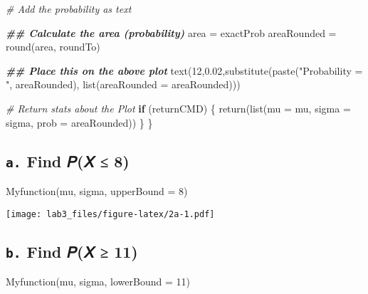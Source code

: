 \documentclass[
  12pt,
]{article}
\newenvironment{Shaded}{\begin{snugshade}}{\end{snugshade}}
\newcommand{\AttributeTok}[1]{\textcolor[rgb]{0.77,0.63,0.00}{#1}}
\newcommand{\CommentTok}[1]{\textcolor[rgb]{0.56,0.35,0.01}{\textit{#1}}}
\newcommand{\ControlFlowTok}[1]{\textcolor[rgb]{0.13,0.29,0.53}{\textbf{#1}}}
\newcommand{\DecValTok}[1]{\textcolor[rgb]{0.00,0.00,0.81}{#1}}
\newcommand{\DocumentationTok}[1]{\textcolor[rgb]{0.56,0.35,0.01}{\textbf{\textit{#1}}}}
\newcommand{\FloatTok}[1]{\textcolor[rgb]{0.00,0.00,0.81}{#1}}
\newcommand{\FunctionTok}[1]{\textcolor[rgb]{0.00,0.00,0.00}{#1}}
\newcommand{\NormalTok}[1]{#1}
\newcommand{\OtherTok}[1]{\textcolor[rgb]{0.56,0.35,0.01}{#1}}
\newcommand{\StringTok}[1]{\textcolor[rgb]{0.31,0.60,0.02}{#1}}
\begin{document}
\begin{Shaded}
\begin{Highlighting}[]
      \CommentTok{\# Add the probability as text}
        
        \DocumentationTok{\#\# Calculate the area (probability)}
\NormalTok{        area }\OtherTok{=}\NormalTok{ exactProb}
\NormalTok{        areaRounded }\OtherTok{=} \FunctionTok{round}\NormalTok{(area, roundTo)}
        
        \DocumentationTok{\#\# Place this on the above plot}
        \FunctionTok{text}\NormalTok{(}\DecValTok{12}\NormalTok{,}\FloatTok{0.02}\NormalTok{,}\FunctionTok{substitute}\NormalTok{(}\FunctionTok{paste}\NormalTok{(}\StringTok{"Probability = "}\NormalTok{, areaRounded), }
                                \FunctionTok{list}\NormalTok{(}\AttributeTok{areaRounded =}\NormalTok{ areaRounded)))}
      
      \CommentTok{\# Return stats about the Plot}
      \ControlFlowTok{if}\NormalTok{ (returnCMD) \{}
        \FunctionTok{return}\NormalTok{(}\FunctionTok{list}\NormalTok{(}\AttributeTok{mu =}\NormalTok{ mu, }
                    \AttributeTok{sigma =}\NormalTok{ sigma,}
                    \AttributeTok{prob =}\NormalTok{ areaRounded))}
\NormalTok{      \}}
\NormalTok{    \}}
\end{Highlighting}
\end{Shaded}

\hypertarget{a.-find-ux1d443ux1d44b-8-1}{%
\subsection{\texorpdfstring{\texttt{a.} Find 𝑃(𝑋 ≤
8)}{a. Find 𝑃(𝑋 ≤ 8)}}\label{a.-find-ux1d443ux1d44b-8-1}}

\begin{Shaded}
\begin{Highlighting}[]
\FunctionTok{Myfunction}\NormalTok{(mu, sigma, }\AttributeTok{upperBound =} \DecValTok{8}\NormalTok{)}
\end{Highlighting}
\end{Shaded}

\texttt{[image: lab3\_files/figure-latex/2a-1.pdf]}

\hypertarget{b.-find-ux1d443ux1d44b-11-1}{%
\subsection{\texorpdfstring{\texttt{b.} Find 𝑃(𝑋 ≥
11)}{b. Find 𝑃(𝑋 ≥ 11)}}\label{b.-find-ux1d443ux1d44b-11-1}}

\begin{Shaded}
\begin{Highlighting}[]
\FunctionTok{Myfunction}\NormalTok{(mu, sigma, }\AttributeTok{lowerBound =} \DecValTok{11}\NormalTok{)}
\end{Highlighting}
\end{Shaded}
\end{document}
